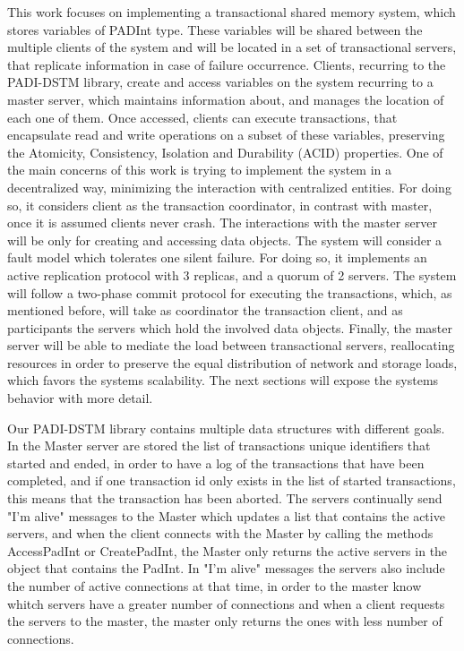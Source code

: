 \documentclass[times, 10pt,twocolumn]{article}
\begin{document}
This work focuses on implementing a transactional shared memory system, which stores variables of PADInt type. These variables will be shared between the multiple clients of the system and will be located in a set of transactional servers, that replicate information in case of failure occurrence. Clients, recurring to the PADI-DSTM library, create and access variables on the system recurring to a master server, which maintains information about, and manages the location of each one of them. Once accessed, clients can execute transactions, that encapsulate read and write operations on a subset of these variables, preserving the Atomicity, Consistency, Isolation and Durability (ACID) properties. One of the main concerns of this work is trying to implement the system in a decentralized way, minimizing the interaction with centralized entities. For doing so, it considers client as the transaction coordinator, in contrast with master, once it is assumed clients never crash. The interactions with the master server will be only for creating and accessing data objects. The system will consider a fault model which tolerates one silent failure. For doing so, it implements an active replication protocol with 3 replicas, and a quorum of 2 servers. The system will follow a two-phase commit protocol for executing the transactions, which, as mentioned before, will take as coordinator the transaction client, and as participants the servers which hold the involved data objects. Finally, the master server will be able to mediate the load between transactional servers, reallocating resources in order to preserve the equal distribution of network and storage loads, which favors the systems scalability. The next sections will expose the systems behavior with more detail.  



Our PADI-DSTM library contains multiple data structures with different goals. In the Master server are stored the list of transactions unique identifiers that started and ended, in order to have a log of the transactions that have been completed, and if one transaction id only exists in the list of started transactions, this means that the transaction has been aborted. The servers continually send "I'm alive" messages to the Master which updates a list that contains the active servers, and when the client connects with the Master by calling the methods AccessPadInt or CreatePadInt, the Master only returns the active servers in the object that contains the PadInt. In "I'm alive" messages the servers also include the number of active connections at that time, in order to the master know whitch servers have a greater number of connections and when a client requests the servers to the master, the master only returns the ones with less number of connections.  
\end{document}
